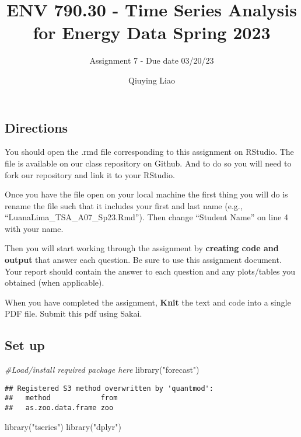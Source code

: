 \documentclass[
]{article}
\title{ENV 790.30 - Time Series Analysis for Energy Data \textbar{}
Spring 2023}
\subtitle{Assignment 7 - Due date 03/20/23}
\author{Qiuying Liao}
\date{}
\newenvironment{Shaded}{\begin{snugshade}}{\end{snugshade}}
\newcommand{\CommentTok}[1]{\textcolor[rgb]{0.56,0.35,0.01}{\textit{#1}}}
\newcommand{\FunctionTok}[1]{\textcolor[rgb]{0.00,0.00,0.00}{#1}}
\newcommand{\NormalTok}[1]{#1}
\newcommand{\StringTok}[1]{\textcolor[rgb]{0.31,0.60,0.02}{#1}}
\begin{document}
\maketitle

\hypertarget{directions}{%
\subsection{Directions}\label{directions}}

You should open the .rmd file corresponding to this assignment on
RStudio. The file is available on our class repository on Github. And to
do so you will need to fork our repository and link it to your RStudio.

Once you have the file open on your local machine the first thing you
will do is rename the file such that it includes your first and last
name (e.g., ``LuanaLima\_TSA\_A07\_Sp23.Rmd''). Then change ``Student
Name'' on line 4 with your name.

Then you will start working through the assignment by \textbf{creating
code and output} that answer each question. Be sure to use this
assignment document. Your report should contain the answer to each
question and any plots/tables you obtained (when applicable).

When you have completed the assignment, \textbf{Knit} the text and code
into a single PDF file. Submit this pdf using Sakai.

\hypertarget{set-up}{%
\subsection{Set up}\label{set-up}}

\begin{Shaded}
\begin{Highlighting}[]
\CommentTok{\#Load/install required package here}
\FunctionTok{library}\NormalTok{(}\StringTok{"forecast"}\NormalTok{)}
\end{Highlighting}
\end{Shaded}

\begin{verbatim}
## Registered S3 method overwritten by 'quantmod':
##   method            from
##   as.zoo.data.frame zoo
\end{verbatim}

\begin{Shaded}
\begin{Highlighting}[]
\FunctionTok{library}\NormalTok{(}\StringTok{"tseries"}\NormalTok{)}
\FunctionTok{library}\NormalTok{(}\StringTok{"dplyr"}\NormalTok{)}
\end{Highlighting}
\end{Shaded}
\end{document}
